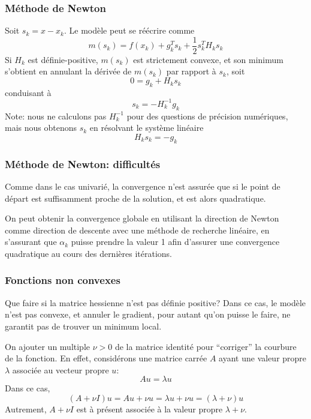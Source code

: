 \documentclass[usepdftitle=false]{beamer}
\begin{document}
\begin{frame}
\frametitle{Méthode de Newton}

Soit $s_k = x-x_k$. Le modèle peut se réécrire comme
$$
m(s_k) = f(x_k) + g_k^T s_k + \frac{1}{2} s_k^T H_k s_k
$$
Si $H_k$ est définie-positive, $m(s_k)$ est strictement convexe, et son minimum s'obtient en annulant la dérivée de $m(s_k)$ par rapport à $s_k$, soit
$$
0 = g_k + H_k s_k
$$
conduisant à
$$
s_k = -H_k^{-1}g_k
$$
Note: nous ne calculons pas $H_k^{-1}$ pour des questions de précision numériques, mais nous obtenons $s_k$ en résolvant le système linéaire
$$
H_k s_k = -g_k
$$

\end{frame}

\begin{frame}
\frametitle{Méthode de Newton: difficultés}

Comme dans le cas univarié, la convergence n'est assurée que si le point de départ est suffisamment proche de la solution, et est alors quadratique.

\mbox{}

On peut obtenir la convergence globale en utilisant la direction de Newton comme direction de descente avec une méthode de recherche linéaire, en s'assurant que $\alpha_k$ puisse prendre la valeur 1 afin d'assurer une convergence quadratique au cours des dernières itérations.

\end{frame}

\begin{frame}
\frametitle{Fonctions non convexes}

Que faire si la matrice hessienne n'est pas définie positive? Dans ce cas, le modèle n'est pas convexe, et annuler le gradient, pour autant qu'on puisse le faire, ne garantit pas de trouver un minimum local.

\mbox{}

On ajouter un multiple $\nu > 0$ de la matrice identité pour ``corriger'' la courbure de la fonction. En effet, considérons une matrice carrée $A$ ayant une valeur propre $\lambda$ associée au vecteur propre $u$:
$$
A u = \lambda u
$$
Dans ce cas,
$$
(A+\nu I)u = Au+\nu u = \lambda u + \nu u = (\lambda + \nu) u
$$
Autrement, $A+\nu I$ est à présent associée à la valeur propre $\lambda + \nu$.

\end{frame}
\end{document}
